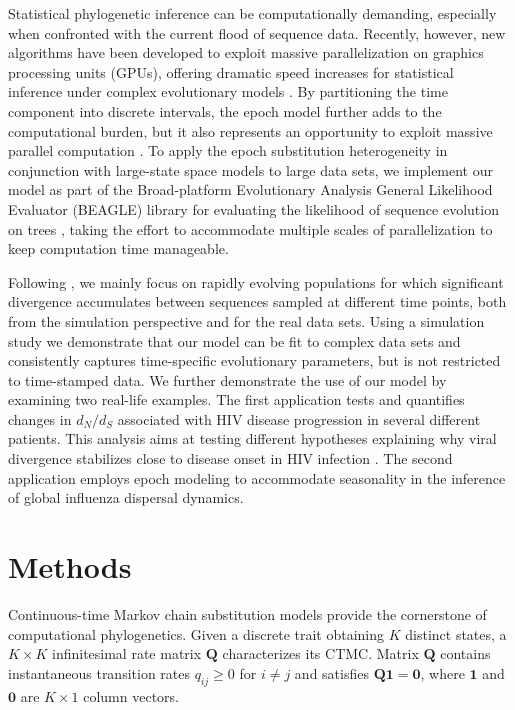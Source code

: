 Statistical phylogenetic inference can be computationally demanding, especially when confronted with the current flood of sequence data.
Recently, however, new algorithms have been developed to exploit massive parallelization on graphics processing units (GPUs), offering dramatic speed increases for statistical inference under complex evolutionary models \citep{Suchard2009,Baele2013}.
By partitioning the time component into discrete intervals, the epoch model further adds to the computational burden, but it also represents an opportunity to exploit massive parallel computation \citep{Suchard2009,Suchard2010}. 
To apply the epoch substitution heterogeneity in conjunction with large-state space models to large data sets, we implement our model as part of the Broad-platform Evolutionary Analysis General Likelihood Evaluator (BEAGLE) library for evaluating the likelihood of sequence evolution on trees \citep{Ayres2012}, taking the effort to accommodate multiple scales of parallelization to keep computation time manageable. 

Following \citet{Goode2008}, we mainly focus on rapidly evolving populations for which significant divergence accumulates between sequences sampled at different time points, both from the simulation perspective and for the real data sets.
Using a simulation study we demonstrate that our model can be fit 
to complex data sets and consistently captures time-specific evolutionary parameters, but is not restricted to time-stamped data.
We further demonstrate the use of our model by examining two real-life examples. 
The first application tests and quantifies changes in $d_N/d_S$ associated with HIV disease progression in several different patients. 
This analysis aims at testing different hypotheses explaining why viral divergence stabilizes close to disease onset in HIV infection \citep{Shankarappa1999}. 
The second application employs epoch modeling to accommodate seasonality in the inference of global influenza dispersal dynamics. 

\section{Methods}

Continuous-time Markov chain substitution models provide the cornerstone of computational phylogenetics.  Given a discrete trait obtaining $K$ distinct states, a $K \times K$ infinitesimal rate matrix $\mathbf{Q}$ characterizes its CTMC. Matrix $\mathbf{Q}$ contains instantaneous transition rates $q_{ij} \ge 0$ for $i \neq j$ and
satisfies $\mathbf{Q} \mathbf{1} = \mathbf{0}$, where $\mathbf{1}$ and $\mathbf{0}$ are $K \times 1$ column vectors.

